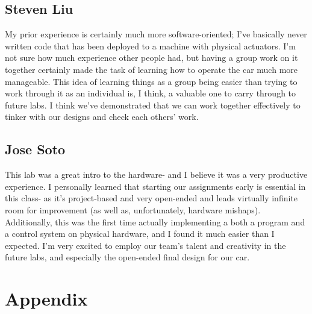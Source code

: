 \documentclass{article}
\begin{document}
\subsection{Steven Liu}
My prior experience is certainly much more software-oriented; I've basically never written code that has been deployed to a machine with physical actuators. I'm not sure how much experience other people had, but having a group work on it together certainly made the task of learning how to operate the car much more manageable. This idea of learning things as a group being easier than trying to work through it as an individual is, I think, a valuable one to carry through to future labs. I think we've demonstrated that we can work together effectively to tinker with our designs and check each others' work.

\subsection{Jose Soto}
This lab was a great intro to the hardware- and I believe it was a very productive experience. I personally learned that starting our assignments early is essential in this class- as it's project-based and very open-ended and leads virtually infinite room for improvement (as well as, unfortunately, hardware mishaps). Additionally, this was the first time actually implementing a both a program and a control system on physical hardware, and I found it much easier than I expected. I'm very excited to employ our team's talent and creativity in the future labs, and especially the open-ended final design for our car.
\newpage 
\section{Appendix}
\end{document}
